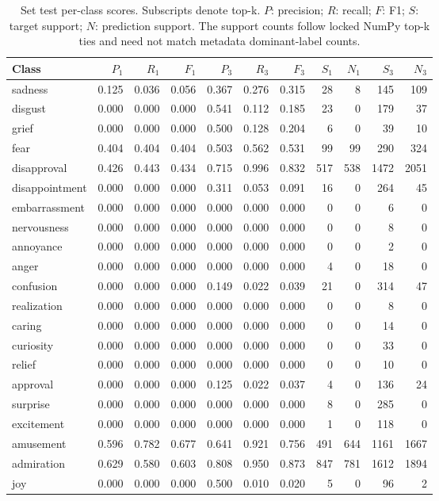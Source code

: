 \begin{table}[!htbp]
\centering
\scriptsize
\setlength{\tabcolsep}{5pt}
\begin{tabular}{lrrrrrrrrrr}
\toprule
Class & $P_1$ & $R_1$ & $F_1$ & $P_3$ & $R_3$ & $F_3$ & $S_1$ & $N_1$ & $S_3$ & $N_3$ \\
\midrule
sadness & 0.125 & 0.036 & 0.056 & 0.367 & 0.276 & 0.315 & 28 & 8 & 145 & 109 \\
disgust & 0.000 & 0.000 & 0.000 & 0.541 & 0.112 & 0.185 & 23 & 0 & 179 & 37 \\
grief & 0.000 & 0.000 & 0.000 & 0.500 & 0.128 & 0.204 & 6 & 0 & 39 & 10 \\
fear & 0.404 & 0.404 & 0.404 & 0.503 & 0.562 & 0.531 & 99 & 99 & 290 & 324 \\
disapproval & 0.426 & 0.443 & 0.434 & 0.715 & 0.996 & 0.832 & 517 & 538 & 1472 & 2051 \\
disappointment & 0.000 & 0.000 & 0.000 & 0.311 & 0.053 & 0.091 & 16 & 0 & 264 & 45 \\
embarrassment & 0.000 & 0.000 & 0.000 & 0.000 & 0.000 & 0.000 & 0 & 0 & 6 & 0 \\
nervousness & 0.000 & 0.000 & 0.000 & 0.000 & 0.000 & 0.000 & 0 & 0 & 8 & 0 \\
annoyance & 0.000 & 0.000 & 0.000 & 0.000 & 0.000 & 0.000 & 0 & 0 & 2 & 0 \\
anger & 0.000 & 0.000 & 0.000 & 0.000 & 0.000 & 0.000 & 4 & 0 & 18 & 0 \\
confusion & 0.000 & 0.000 & 0.000 & 0.149 & 0.022 & 0.039 & 21 & 0 & 314 & 47 \\
realization & 0.000 & 0.000 & 0.000 & 0.000 & 0.000 & 0.000 & 0 & 0 & 8 & 0 \\
caring & 0.000 & 0.000 & 0.000 & 0.000 & 0.000 & 0.000 & 0 & 0 & 14 & 0 \\
curiosity & 0.000 & 0.000 & 0.000 & 0.000 & 0.000 & 0.000 & 0 & 0 & 33 & 0 \\
relief & 0.000 & 0.000 & 0.000 & 0.000 & 0.000 & 0.000 & 0 & 0 & 10 & 0 \\
approval & 0.000 & 0.000 & 0.000 & 0.125 & 0.022 & 0.037 & 4 & 0 & 136 & 24 \\
surprise & 0.000 & 0.000 & 0.000 & 0.000 & 0.000 & 0.000 & 8 & 0 & 285 & 0 \\
excitement & 0.000 & 0.000 & 0.000 & 0.000 & 0.000 & 0.000 & 1 & 0 & 118 & 0 \\
amusement & 0.596 & 0.782 & 0.677 & 0.641 & 0.921 & 0.756 & 491 & 644 & 1161 & 1667 \\
admiration & 0.629 & 0.580 & 0.603 & 0.808 & 0.950 & 0.873 & 847 & 781 & 1612 & 1894 \\
joy & 0.000 & 0.000 & 0.000 & 0.500 & 0.010 & 0.020 & 5 & 0 & 96 & 2 \\
\bottomrule
\end{tabular}
\caption{Set test per-class scores. Subscripts denote top-k. $P$: precision; $R$: recall; $F$: F1; $S$: target support; $N$: prediction support. The support counts follow locked NumPy top-k ties and need not match metadata dominant-label counts.}
\label{tab:classes-b2_set_control}
\end{table}
